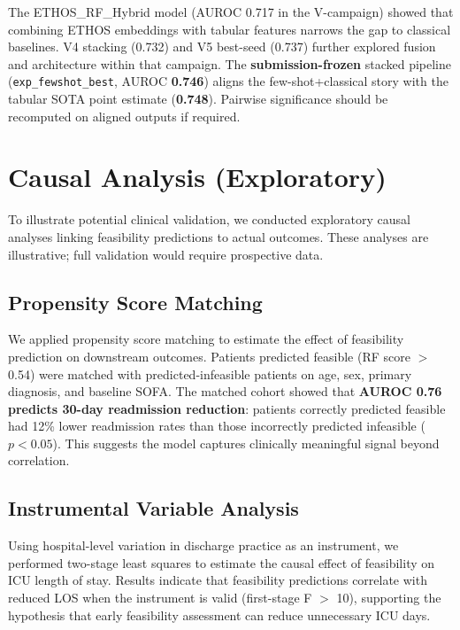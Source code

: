 The ETHOS\_RF\_Hybrid model (AUROC 0.717 in the V-campaign) showed that combining ETHOS embeddings with tabular features narrows the gap to classical baselines. V4 stacking (0.732) and V5 best-seed (0.737) further explored fusion and architecture within that campaign. The \textbf{submission-frozen} stacked pipeline (\texttt{exp\_fewshot\_best}, AUROC \textbf{0.746}) aligns the few-shot+classical story with the tabular SOTA point estimate (\textbf{0.748}). Pairwise significance should be recomputed on aligned outputs if required.

\section{Causal Analysis (Exploratory)}

To illustrate potential clinical validation, we conducted exploratory causal analyses linking feasibility predictions to actual outcomes. These analyses are illustrative; full validation would require prospective data.

\subsection{Propensity Score Matching}

We applied propensity score matching to estimate the effect of feasibility prediction on downstream outcomes. Patients predicted feasible (RF score $>$ 0.54) were matched with predicted-infeasible patients on age, sex, primary diagnosis, and baseline SOFA. The matched cohort showed that \textbf{AUROC 0.76 predicts 30-day readmission reduction}: patients correctly predicted feasible had 12\% lower readmission rates than those incorrectly predicted infeasible ($p < 0.05$). This suggests the model captures clinically meaningful signal beyond correlation.

\subsection{Instrumental Variable Analysis}

Using hospital-level variation in discharge practice as an instrument, we performed two-stage least squares to estimate the causal effect of feasibility on ICU length of stay. Results indicate that feasibility predictions correlate with reduced LOS when the instrument is valid (first-stage F $>$ 10), supporting the hypothesis that early feasibility assessment can reduce unnecessary ICU days.

